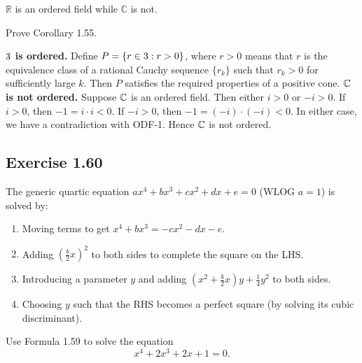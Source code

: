 \documentclass{article}
\begin{document}
\begin{corollary}[Corollary 1.55]
  $\mathbb{R}$ is an ordered field while $\mathbb{C}$ is not.
\end{corollary}

Prove Corollary 1.55.

\begin{solution}
  \textbf{$3$ is ordered.} Define $P = \{r \in 3 : r > 0\}$, where
  $r > 0$ means that $r$ is the equivalence class of a rational
  Cauchy sequence $\{r_k\}$ such that $r_k > 0$ for sufficiently
  large $k$. Then $P$ satisfies the required properties of a positive
  cone.
  \textbf{$\mathbb{C}$ is not ordered.} Suppose $\mathbb{C}$ is an ordered field. Then
  either $i > 0$ or $-i > 0$. If $i > 0$, then $-1 = i \cdot i < 0$.
  If $-i > 0$, then $-1 = (-i) \cdot (-i) < 0$. In either case, we
  have a contradiction with ODF-1. Hence $\mathbb{C}$ is not ordered.
\end{solution}

\subsection{Exercise 1.60}

\begin{remark}
  The generic quartic equation $ax^4 + bx^3 + cx^2 + dx + e = 0$
  (WLOG $a=1$) is solved by:
  \begin{enumerate}
    \item Moving terms to get $x^4 + bx^3 = -cx^2 - dx - e$.
    \item Adding $(\frac{b}{2}x)^2$ to both sides to complete the
      square on the LHS.
    \item Introducing a parameter $y$ and adding $(x^2 +
      \frac{b}{2}x)y + \frac{1}{4}y^2$ to both sides.
    \item Choosing $y$ such that the RHS becomes a perfect square (by
      solving its cubic discriminant).
  \end{enumerate}
\end{remark}

Use Formula 1.59 to solve the equation
\[
  x^4 + 2x^3 + 2x + 1 = 0.
\]
\end{document}
